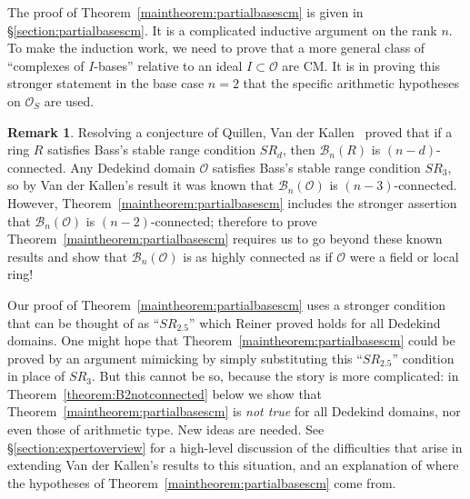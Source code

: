 \documentclass[11 pt]{article}
\theoremstyle{plain}
\theoremstyle{definition}
\newtheorem{remark}[theorem]{Remark}
\numberwithin{equation}{section}
\newcommand{\margin}[1]{\marginpar{\raggedright{\scriptsize #1}}}
\newcommand{\para}[1]{\bigskip\noindent\textbf{#1.}}
\renewcommand{\O}{\mathcal{O}}
\newcommand\PartialBases{\ensuremath{\mathcal{B}}}
\newcommand{\PB}{\PartialBases}
\newcommand{\change}{}
\begin{document}
The proof of Theorem~\ref{maintheorem:partialbasescm} is given in \S\ref{section:partialbasescm}.    It is a complicated inductive argument on the rank $n$. To make the induction work, we need to prove that a more general class of  ``complexes of $I$-bases'' relative to an ideal $I\subset \O$ are CM.  It is in proving this stronger statement in the base case $n=2$ that the specific arithmetic hypotheses on $\O_S$ are used. \change

\begin{remark}
\label{remark:vdkintro}
Resolving a conjecture of Quillen, Van der Kallen~\cite[Theorem~2.6]{VanDerKallenStability} 
proved that if a ring $R$ satisfies Bass's stable range condition $SR_d$, then $\PB_n(R)$ is $(n-d)$-connected. 
Any Dedekind domain $\O$ satisfies Bass's stable range condition $SR_3$, so by Van der Kallen's result it was known that $\PB_n(\O)$ 
is $(n-3)$-connected. However, Theorem~\ref{maintheorem:partialbasescm} includes the stronger assertion that $\PB_n(\O)$ 
is $(n-2)$-connected; therefore to prove Theorem~\ref{maintheorem:partialbasescm} requires us to go beyond these known results and show that $\PB_n(\O)$ is as highly connected as if $\O$ were a field or local ring!

Our proof of Theorem~\ref{maintheorem:partialbasescm} uses a stronger condition that can be thought of as ``$SR_{2.5}$'' which Reiner proved holds for all Dedekind domains.  One might hope that Theorem~\ref{maintheorem:partialbasescm} could be proved by an argument mimicking \cite{VanDerKallenStability} by simply substituting this ``$SR_{2.5}$'' condition in place of $SR_3$. But this cannot be so, because the story is more complicated: in Theorem~\ref{theorem:B2notconnected} below we %
show that Theorem~\ref{maintheorem:partialbasescm} is \emph{not true} for all Dedekind domains, nor even those of arithmetic type.  New ideas are needed. See \S\ref{section:expertoverview} for a high-level discussion of the difficulties that arise in extending Van der Kallen's results to this situation, and an explanation of where the hypotheses of Theorem~\ref{maintheorem:partialbasescm} come from.
 \end{remark}

\end{document}
